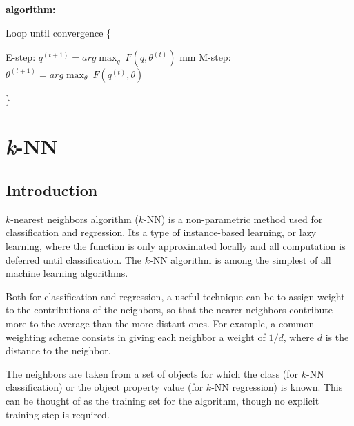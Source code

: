 \noindent \textbf{algorithm:}

Loop until convergence \{

	\qquad E-step: \qquad $q^{(t+1)} = arg\max _{q}\ F(q,\theta ^{(t)})$
	 mm
	\qquad M-step: \qquad $\theta^{(t+1)}=arg\max_{\theta }\ F(q^{(t)},\theta)$

\}













\newpage
\section{\textit{k}-NN}
\subsection{Introduction}
$k$-nearest neighbors algorithm ($k$-NN) is a non-parametric method used for classification and regression. Its a type of instance-based learning, or lazy learning, where the function is only approximated locally and all computation is deferred until classification. The $k$-NN algorithm is among the simplest of all machine learning algorithms.

Both for classification and regression, a useful technique can be to assign weight to the contributions of the neighbors, so that the nearer neighbors contribute more to the average than the more distant ones. For example, a common weighting scheme consists in giving each neighbor a weight of $1/d$, where $d$ is the distance to the neighbor.

The neighbors are taken from a set of objects for which the class (for $k$-NN classification) or the object property value (for $k$-NN regression) is known. This can be thought of as the training set for the algorithm, though no explicit training step is required.



